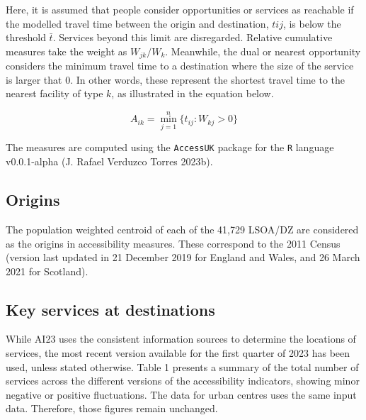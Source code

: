 \documentclass{article}
\begin{document}
Here, it is assumed that people consider opportunities or services as
reachable if the modelled travel time between the origin and
destination, \(t{ij}\), is below the threshold \(\bar{t}\). Services
beyond this limit are disregarded. Relative cumulative measures take the
weight as \(W_{jk} / W_k\). Meanwhile, the dual or nearest opportunity
considers the minimum travel time to a destination where the size of the
service is larger that 0. In other words, these represent the shortest
travel time to the nearest facility of type \(k\), as illustrated in the
equation below.

\[
A_{ik} = \min_{j=1}^{n} \{ t_{ij} : W_{kj} > 0 \}
\]

The measures are computed using the \texttt{AccessUK} package for the
\texttt{R} language v0.0.1-alpha (J. Rafael Verduzco Torres 2023b).

\hypertarget{origins}{%
\subsection{Origins}\label{origins}}

The population weighted centroid of each of the 41,729 LSOA/DZ are
considered as the origins in accessibility measures. These correspond to
the 2011 Census (version last updated in 21 December 2019 for England
and Wales, and 26 March 2021 for Scotland).

\hypertarget{key-services-at-destinations}{%
\subsection{Key services at
destinations}\label{key-services-at-destinations}}

While AI23 uses the consistent information sources to determine the
locations of services, the most recent version available for the first
quarter of 2023 has been used, unless stated otherwise. Table 1 presents
a summary of the total number of services across the different versions
of the accessibility indicators, showing minor negative or positive
fluctuations. The data for urban centres uses the same input data.
Therefore, those figures remain unchanged.
\end{document}
